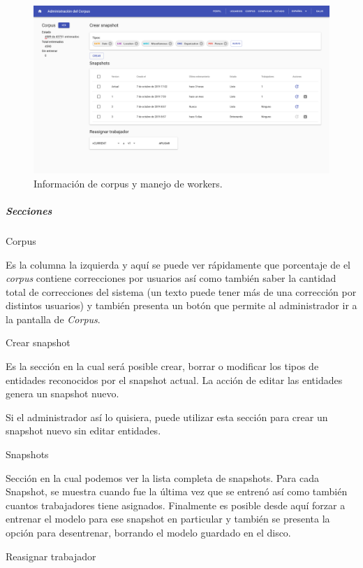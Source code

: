 \documentclass[12pt,a4paper,]{scrartcl}
\let\oldsubparagraph\subparagraph
\renewcommand{\subparagraph}[1]{\oldsubparagraph{#1}\mbox{}}
\begin{document}
\begin{figure}[H]

{\centering \includegraphics{assets/logic/status.pdf} 

}

\caption{Información de corpus y manejo de workers.}\label{fig:logic-status}
\end{figure}

\hypertarget{secciones}{%
\subparagraph{Secciones}\label{secciones}}

Corpus

Es la columna la izquierda y aquí se puede ver rápidamente que porcentaje de el \emph{corpus} contiene correcciones por usuarios así como también saber la cantidad total de correcciones del sistema (un texto puede tener más de una corrección por distintos usuarios) y también presenta un botón que permite al administrador ir a la pantalla de \emph{Corpus}.

Crear snapshot

Es la sección en la cual será posible crear, borrar o modificar los tipos de entidades reconocidos por el snapshot actual. La acción de editar las entidades genera un snapshot nuevo.

Si el administrador así lo quisiera, puede utilizar esta sección para crear un snapshot nuevo sin editar entidades.

Snapshots

Sección en la cual podemos ver la lista completa de snapshots.
Para cada Snapshot, se muestra cuando fue la última vez que se entrenó así como también cuantos trabajadores tiene asignados. Finalmente es posible desde aquí forzar a entrenar el modelo para ese snapshot en particular y también se presenta la opción para desentrenar, borrando el modelo guardado en el disco.

Reasignar trabajador
\end{document}
